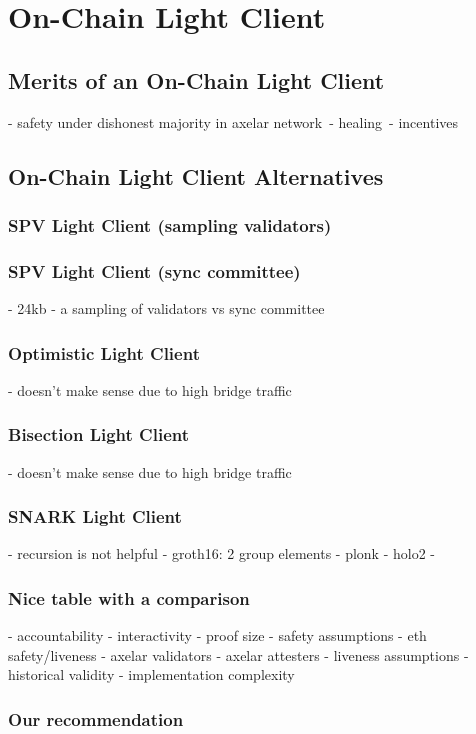 \section{On-Chain Light Client}
\subsection{Merits of an On-Chain Light Client}
- safety under dishonest majority in axelar network\
- healing\
- incentives 

\subsection{On-Chain Light Client Alternatives}
\subsubsection{SPV Light Client (sampling validators)}
\subsubsection{SPV Light Client (sync committee)} 
        - 24kb 
        - a sampling of validators vs sync committee
\subsubsection{Optimistic Light Client}
        - doesn't make sense due to high bridge traffic
\subsubsection{Bisection Light Client}
        - doesn't make sense due to high bridge traffic
\subsubsection{SNARK Light Client}
        - recursion is not helpful
        - groth16: 2 group elements
        - plonk
        - holo2
        -
\subsubsection{Nice table with a comparison}
         - accountability
         - interactivity
         - proof size 
         - safety assumptions
             - eth safety/liveness
             - axelar validators 
             - axelar attesters 
         - liveness assumptions
         - historical validity
         - implementation complexity
\subsubsection{Our recommendation}
